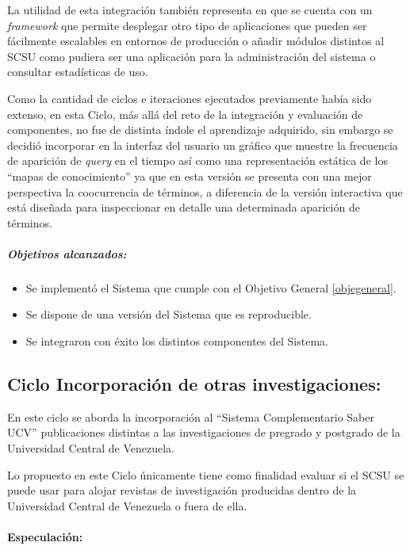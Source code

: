 \documentclass[
  12pt,
  openany]{book}
\begin{document}
La utilidad de esta integración también representa en que se cuenta con un \emph{framework} que permite desplegar otro tipo de aplicaciones que pueden ser fácilmente escalables en entornos de producción o añadir módulos distintos al SCSU como pudiera ser una aplicación para la administración del sistema o consultar estadísticas de uso.

Como la cantidad de ciclos e iteraciones ejecutados previamente había sido extenso, en esta Ciclo, más allá del reto de la integración y evaluación de componentes, no fue de distinta índole el aprendizaje adquirido, sin embargo se decidió incorporar en la interfaz del usuario un gráfico que muestre la frecuencia de aparición de \emph{query} en el tiempo así como una representación estática de los ``mapas de conocimiento'' ya que en esta versión se presenta con una mejor perspectiva la coocurrencia de términos, a diferencia de la versión interactiva que está diseñada para inspeccionar en detalle una determinada aparición de términos.

\hypertarget{objetivos-alcanzados-2}{%
\subparagraph{Objetivos alcanzados:}\label{objetivos-alcanzados-2}}

\begin{itemize}
\item
  Se implementó el Sistema que cumple con el Objetivo General \ref{objegeneral}.
\item
  Se dispone de una versión del Sistema que es reproducible.
\item
  Se integraron con éxito los distintos componentes del Sistema.
\end{itemize}

\newpage

\hypertarget{desarrollociclos6}{%
\subsection{Ciclo Incorporación de otras investigaciones:}\label{desarrollociclos6}}

En este ciclo se aborda la incorporación al ``Sistema Complementario Saber UCV'' publicaciones distintas a las investigaciones de pregrado y postgrado de la Universidad Central de Venezuela.

Lo propuesto en este Ciclo únicamente tiene como finalidad evaluar si el SCSU se puede usar para alojar revistas de investigación producidas dentro de la Universidad Central de Venezuela o fuera de ella.

\hypertarget{dcseisespe}{%
\paragraph{Especulación:}\label{dcseisespe}}
\end{document}
